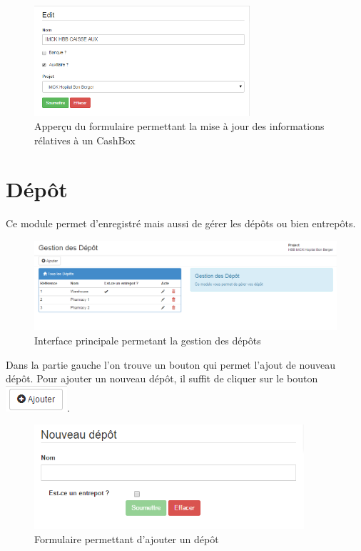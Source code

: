 \documentclass[12pt,a4paper]{report}
\begin{document}
\begin{figure}[h]
\begin{center}
\includegraphics[width=8cm]{pic/EditCashBox.png}
\end{center}
\caption{Apperçu du formulaire permettant la mise à jour des informations rélatives à un CashBox}
\label{Apperçu du formulaire permettant la mise à jour des informations rélatives à un CashBox}
\end{figure} 

\newpage
\section{Dépôt}
Ce module permet d'enregistré mais aussi de gérer les dépôts ou bien entrepôts.

\begin{figure}[h]
\begin{center}
\includegraphics[width=14cm]{pic/GestionDesDepot.png}
\end{center}
\caption{Interface principale permetant la gestion des dépôts}
\label{Interface principale permetant la gestion des dépôts}
\end{figure}

Dans la partie gauche l'on trouve un bouton qui permet l'ajout de nouveau dépôt. Pour ajouter un nouveau dépôt, il suffit de cliquer sur le bouton \includegraphics[scale=0.7]{pic/AddNewStore.png}.

\begin{figure}[h]
\begin{center}
\includegraphics[width=10cm]{pic/NewStore.png}
\end{center}
\caption{Formulaire permettant d'ajouter un dépôt}
\label{Formulaire permettant d'ajouter un dépôt}
\end{figure}
\end{document}
